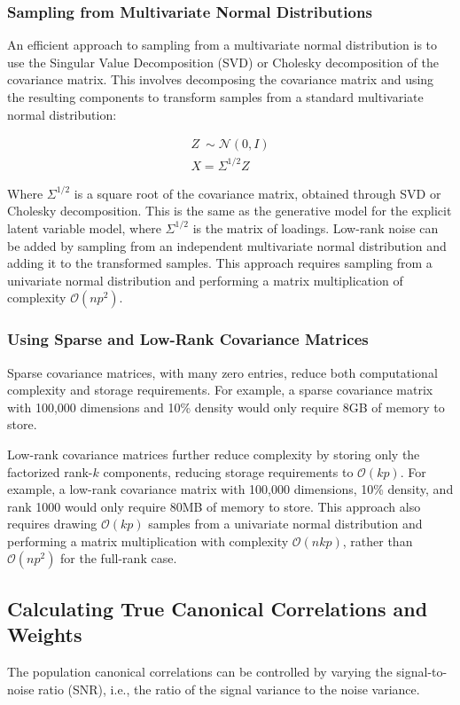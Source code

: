\subsubsection{Sampling from Multivariate Normal Distributions}
An efficient approach to sampling from a multivariate normal distribution is to use the Singular Value Decomposition (SVD) or Cholesky decomposition of the covariance matrix. This involves decomposing the covariance matrix and using the resulting components to transform samples from a standard multivariate normal distribution:

\begin{align}
Z~\sim \mathcal{N}(0, I) \\
X = \Sigma^{1/2}Z
\end{align}

Where \( \Sigma^{1/2} \) is a square root of the covariance matrix, obtained through SVD or Cholesky decomposition. This is the same as the generative model for the explicit latent variable model, where \( \Sigma^{1/2} \) is the matrix of loadings. Low-rank noise can be added by sampling from an independent multivariate normal distribution and adding it to the transformed samples. This approach requires sampling from a univariate normal distribution and performing a matrix multiplication of complexity \(\mathcal{O}(np^2)\).

\subsubsection{Using Sparse and Low-Rank Covariance Matrices}
Sparse covariance matrices, with many zero entries, reduce both computational complexity and storage requirements. For example, a sparse covariance matrix with 100,000 dimensions and 10\% density would only require 8GB of memory to store.

Low-rank covariance matrices further reduce complexity by storing only the factorized rank-$k$ components, reducing storage requirements to \(\mathcal{O}(kp)\). For example, a low-rank covariance matrix with 100,000 dimensions, 10\% density, and rank 1000 would only require 80MB of memory to store. This approach also requires drawing \(\mathcal{O}(kp)\) samples from a univariate normal distribution and performing a matrix multiplication with complexity \(\mathcal{O}(nkp)\), rather than \(\mathcal{O}(np^2)\) for the full-rank case.

\subsection{Calculating True Canonical Correlations and Weights}
The population canonical correlations can be controlled by varying the signal-to-noise ratio (SNR), i.e., the ratio of the signal variance to the noise variance.

